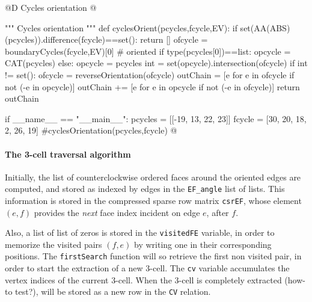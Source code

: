 \documentclass[11pt,oneside]{article}    %
\begin{document}
@D Cycles orientation
@{""" Cycles orientation """
def cyclesOrient(pcycles,fcycle,EV):
    if set(AA(ABS)(pcycles)).difference(fcycle)==set(): return []
    ofcycle = boundaryCycles(fcycle,EV)[0] # oriented 
    if type(pcycles[0])==list: opcycle = CAT(pcycles)
    else: opcycle = pcycles
    int = set(opcycle).intersection(ofcycle)
    if int != set(): 
        ofcycle = reverseOrientation(ofcycle)
    outChain = [e for e in ofcycle if not (-e in opcycle)] 
    outChain += [e for e in opcycle if not (-e in ofcycle)] 
    return outChain

if __name__ == "__main__":
    pcycles = [[-19, 13, 22, 23]]
    fcycle = [30, 20, 18, 2, 26, 19]
    #cyclesOrientation(pcycles,fcycle)
@}



\paragraph{The 3-cell traversal algorithm}
Initially, the list of counterclockwise ordered faces around the oriented edges are computed, and stored as indexed by edges in the \texttt{EF\_angle} list of lists. This information is stored in the compressed sparse row matrix \texttt{csrEF}, whose element $(e,f)$ provides the \emph{next} face index  incident on edge $e$, after $f$. 

Also, a list of list of zeros is stored in the \texttt{visitedFE} variable, in order to memorize the visited pairs $(f,e)$ by writing one in their corresponding positions. The \texttt{firstSearch} function will so retrieve the first non visited pair, in order to start the extraction of a new 3-cell. The \texttt{cv} variable accumulates the vertex indices of the current 3-cell. When the 3-cell is completely extracted (how-to test?), will be stored as a new row in the \texttt{CV} relation. 
\end{document}
